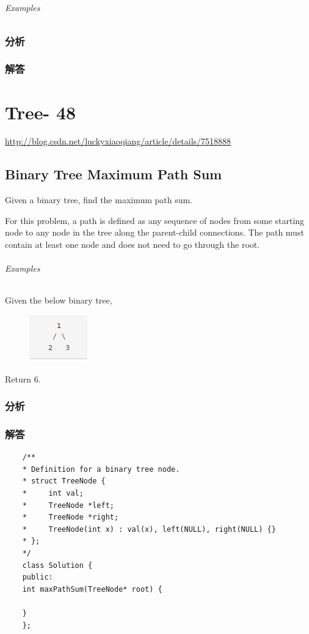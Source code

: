 \documentclass[UTF8,a4paper,12pt]{ctexbook}
\begin{document}
\section{}
	
	\subparagraph{Examples}
	
	\subsection{分析}
	
	\subsection{解答}	
\chapter{Tree- 48}
	\url{http://blog.csdn.net/luckyxiaoqiang/article/details/7518888}
\section{Binary Tree Maximum Path Sum}
		Given a binary tree, find the maximum path sum.
		
		For this problem, a path is defined as any sequence of nodes from some starting node to any node in the tree along the parent-child connections. The path must contain at least one node and does not need to go through the root.
	\subparagraph{Examples}
		Given the below binary tree,
		
		\begin{figure}[h]
			\centering
			\includegraphics[scale = 1]{Tree_1.png}
		\end{figure}
		
		Return 6.	
	\subsection{分析}
	
	\subsection{解答}
		\begin{lstlisting}
	/**
	* Definition for a binary tree node.
	* struct TreeNode {
	*     int val;
	*     TreeNode *left;
	*     TreeNode *right;
	*     TreeNode(int x) : val(x), left(NULL), right(NULL) {}
	* };
	*/
	class Solution {
	public:
	int maxPathSum(TreeNode* root) {
	
	}
	};
		\end{lstlisting}
\end{document}
